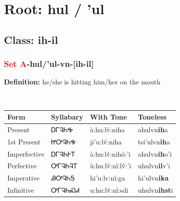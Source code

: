 \needspace{4in}
\section*{Root: hul / 'ul}
\nopagebreak
{}
\needspace{3in}
\subsection*{Class: ih-il}
\nopagebreak
\needspace{2in}
\subsubsection*{\textcolor{Red}{Set A}{-}\textbf{hul/'ul}{-}vn{-}[ih-il]}
\nopagebreak
\textbf{Definition: } he/she is hitting him/her on the mouth
\\[0.5em]
\begin{tabularx}{\textwidth}{l X X X}%
\toprule%
\textbf{Form}&\textbf{Syllabary}&\textbf{With Tone}&\textbf{Toneless}\\%
\midrule%
Present&ᎠᎱᎸᏂᎭ&à:hu:lv́:niha&ahulvn\textbf{ih}a\\%
1st Present&ᏥᎤᎸᏂᎭ&ji’u:lv́:niha&tsi'ulvn\textbf{ih}a\\%
Imperfective&ᎠᎱᎸᏂᎰᎢ&à:hu:lv́:nihó:’i&ahulvn\textbf{ih}o'i\\%
Perfective&ᎤᎱᎸᏂᎸᎢ&ù:hu:lv̌:nî:lv̌:’i&uhulvn\textbf{il}v'i\\%
Imperative&ᎯᎤᎸᏂᎦ&hi’u:lv:nì:ga&hi'ulvn\textbf{ika}\\%
Infinitive&ᎤᎱᎸᏂᏍᏗ&u:hu:lv̌:nî:sdi&uhulvn\textbf{ihst}i\\%
\bottomrule%
\end{tabularx}
\\[1em]